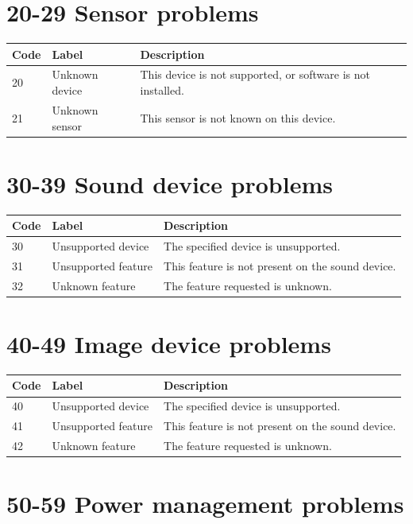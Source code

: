 \documentclass[
]{book}
\begin{document}
\section{20-29 Sensor problems}\label{sensor-problems}

\begin{tabular}{l|l|l}
\hline
Code & Label & Description\\
\hline
20 & Unknown device & This device is not supported, or software is not installed.\\
\hline
21 & Unknown sensor & This sensor is not known on this device.\\
\hline
\end{tabular}

\section{30-39 Sound device problems}\label{sound-device-problems}

\begin{tabular}{l|l|l}
\hline
Code & Label & Description\\
\hline
30 & Unsupported device & The specified device is unsupported.\\
\hline
31 & Unsupported feature & This feature is not present on the sound device.\\
\hline
32 & Unknown feature & The feature requested is unknown.\\
\hline
\end{tabular}

\section{40-49 Image device problems}\label{image-device-problems}

\begin{tabular}{l|l|l}
\hline
Code & Label & Description\\
\hline
40 & Unsupported device & The specified device is unsupported.\\
\hline
41 & Unsupported feature & This feature is not present on the sound device.\\
\hline
42 & Unknown feature & The feature requested is unknown.\\
\hline
\end{tabular}

\section{50-59 Power management problems}\label{power-management-problems}
\end{document}
